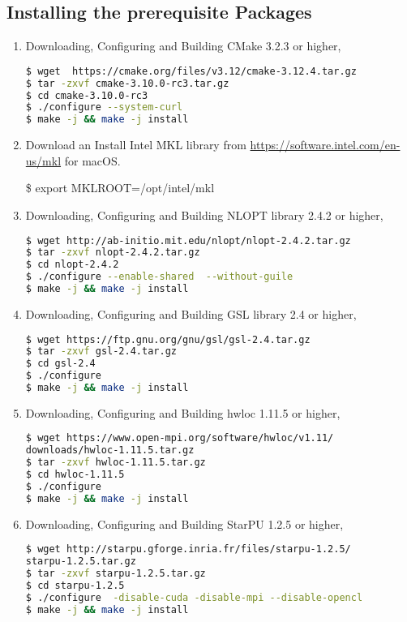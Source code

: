 \documentclass[
10pt, %
a4paper, %
oneside, %
headinclude,footinclude, %
BCOR5mm, %
]{scrartcl}
\begin{document}
\subsection{Installing the prerequisite Packages}
\begin{enumerate}
\item
\noindent Downloading, Configuring and Building CMake 3.2.3 or higher,
\begin{lstlisting}[language=bash]
$ wget  https://cmake.org/files/v3.12/cmake-3.12.4.tar.gz
$ tar -zxvf cmake-3.10.0-rc3.tar.gz
$ cd cmake-3.10.0-rc3
$ ./configure --system-curl
$ make -j && make -j install
\end{lstlisting}

\item

\noindent Download an Install Intel MKL library from \url{https://software.intel.com/en-us/mkl} for macOS.

\noindent \$ export MKLROOT=/opt/intel/mkl

\item
\noindent Downloading, Configuring and Building NLOPT library 2.4.2 or higher,
\begin{lstlisting}[language=bash]
$ wget http://ab-initio.mit.edu/nlopt/nlopt-2.4.2.tar.gz
$ tar -zxvf nlopt-2.4.2.tar.gz
$ cd nlopt-2.4.2
$ ./configure --enable-shared  --without-guile
$ make -j && make -j install
\end{lstlisting}

\item
\noindent Downloading, Configuring and Building GSL library 2.4 or higher,
\begin{lstlisting}[language=bash]
$ wget https://ftp.gnu.org/gnu/gsl/gsl-2.4.tar.gz
$ tar -zxvf gsl-2.4.tar.gz
$ cd gsl-2.4
$ ./configure 
$ make -j && make -j install
\end{lstlisting}

\item
\noindent Downloading, Configuring and Building hwloc 1.11.5 or higher,
\begin{lstlisting}[language=bash]
$ wget https://www.open-mpi.org/software/hwloc/v1.11/
downloads/hwloc-1.11.5.tar.gz
$ tar -zxvf hwloc-1.11.5.tar.gz
$ cd hwloc-1.11.5
$ ./configure
$ make -j && make -j install
\end{lstlisting}

\item
\noindent Downloading, Configuring and Building StarPU 1.2.5 or higher,
\begin{lstlisting}[language=bash]
$ wget http://starpu.gforge.inria.fr/files/starpu-1.2.5/
starpu-1.2.5.tar.gz
$ tar -zxvf starpu-1.2.5.tar.gz
$ cd starpu-1.2.5
$ ./configure  -disable-cuda -disable-mpi --disable-opencl
$ make -j && make -j install
\end{lstlisting}


\end{enumerate}
\end{document}
